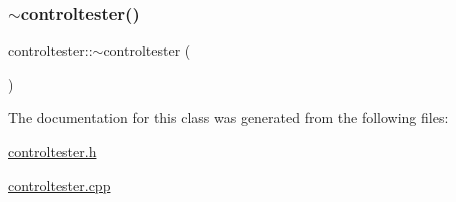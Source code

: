 \subsubsection{\texorpdfstring{$\sim$controltester()}{~controltester()}}
{\footnotesize\ttfamily controltester\+::$\sim$controltester (\begin{DoxyParamCaption}{ }\end{DoxyParamCaption})}



The documentation for this class was generated from the following files\+:\begin{DoxyCompactItemize}
\item 
\mbox{\hyperlink{controltester_8h}{controltester.\+h}}\item 
\mbox{\hyperlink{controltester_8cpp}{controltester.\+cpp}}\end{DoxyCompactItemize}

